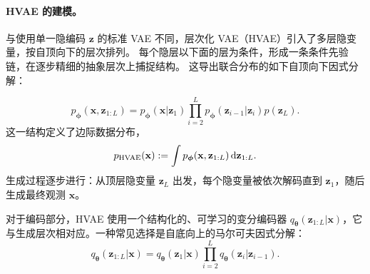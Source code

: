 \paragraph{HVAE 的建模。}
与使用单一隐编码 $\mathbf{z}$ 的标准 VAE 不同，层次化 VAE（HVAE）引入了多层隐变量，按自顶向下的层次排列。
每个隐层以下面的层为条件，形成一条条件先验链，在逐步精细的抽象层次上捕捉结构。
这导出联合分布的如下自顶向下因式分解：

\[
p_{\bm{\phi}}(\mathbf{x}, \mathbf{z}_{1:L}) = p_{\bm{\phi}}(\mathbf{x} | \mathbf{z}_1) \prod_{i=2}^{L} p_{\bm{\phi}}(\mathbf{z}_{i-1}|\mathbf{z}_i)   p(\mathbf{z}_L).
\]
这一结构定义了边际数据分布，
\[
p_{\text{HVAE}}(\mathbf{x}) := \int p_{\bm{\phi}}(\mathbf{x}, \mathbf{z}_{1:L}) \mathop{}\!\mathrm{d} \mathbf{z}_{1:L}.
\]
 生成过程逐步进行：从顶层隐变量 $ \mathbf{z}_L $ 出发，每个隐变量被依次解码直到 $ \mathbf{z}_1 $，随后生成最终观测 $ \mathbf{x} $。

对于编码部分，HVAE 使用一个结构化的、可学习的变分编码器 $ q_{\bm{\theta}}(\mathbf{z}_{1:L}|\mathbf{x}) $，它与生成层次相对应。一种常见选择是自底向上的马尔可夫因式分解：
\[
q_{\bm{\theta}}(\mathbf{z}_{1:L} | \mathbf{x}) = q_{\bm{\theta}}(\mathbf{z}_1 | \mathbf{x}) \prod_{i=2}^{L} q_{\bm{\theta}}(\mathbf{z}_i | \mathbf{z}_{i-1}).
\]


